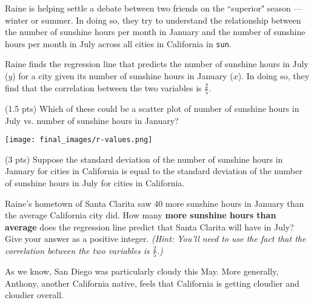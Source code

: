 \begin{prob}[(11 pts)]

Raine is helping settle a debate between two friends on the ``superior" season --- winter or summer. In doing so, they try to understand the relationship between the number of sunshine hours per month in January and the number of sunshine hours per month in July across all cities in California in \texttt{sun}.

Raine finds the regression line that predicts the number of sunshine hours in July ($y$) for a city given its number of sunshine hours in January ($x$). In doing so, they find that the correlation between the two variables is $\frac{2}{5}$.

\begin{subprobset}

\begin{subprob}(1.5 pts) Which of these could be a scatter plot of number of sunshine hours in July vs. number of sunshine hours in January?

\begin{center}
\texttt{[image: final\_images/r-values.png]}
\end{center}

    
\end{subprob}

\newpage

\begin{subprob}(3 pts) Suppose the standard deviation of the number of sunshine hours in January for cities in California is equal to the standard deviation of the number of sunshine hours in July for cities in California.

Raine's hometown of Santa Clarita saw 40 more sunshine hours in January than the average California city did. How many \textbf{more sunshine hours than average} does the regression line predict that Santa Clarita will have in July? Give your answer as a positive integer. \textit{(Hint: You'll need to use the fact that the correlation between the two variables is $\frac{2}{5}$.)}

\inlineresponsebox[2in]{}{}
    
\end{subprob}

\end{subprobset}

As we know, San Diego was particularly cloudy this May. More generally, Anthony, another California native, feels that California is getting cloudier and cloudier overall.


\end{prob}
